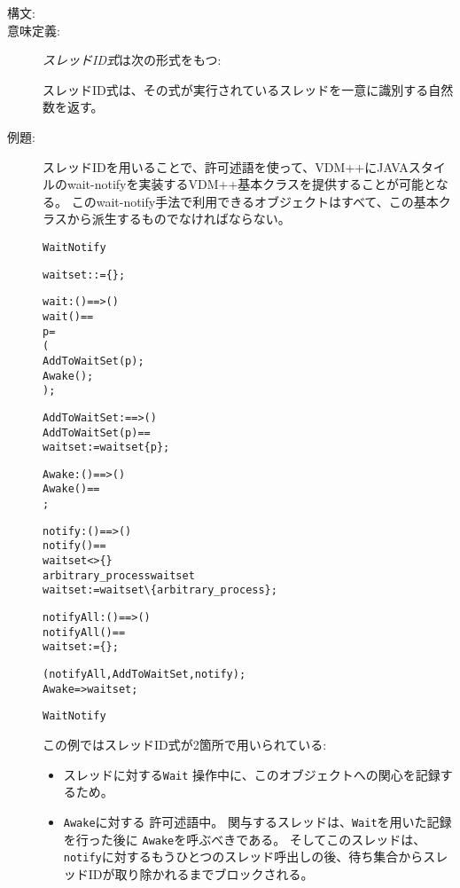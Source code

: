 \documentclass[\pformat,12pt]{jarticle}
\begin{document}
\begin{description}
\item[構文:] 
  
\item[意味定義:] {\it スレッドID式}は次の形式をもつ:

  \begin{alltt}
  \end{alltt}
  スレッドID式は、その式が実行されているスレッドを一意に識別する自然数を返す。

\item[例題:] 
スレッドIDを用いることで、許可述語を使って、VDM++にJAVAスタイルのwait-notifyを実装するVDM++基本クラスを提供することが可能となる。
このwait-notify手法で利用できるオブジェクトはすべて、この基本クラスから派生するものでなければならない。
\begin{alltt}
 WaitNotify

    waitset :  := \{\};

    \PROTECTED wait: () ==> ()
    wait() == 
       p = 
       (
        AddToWaitSet( p );
        Awake();
       );

    AddToWaitSet :  ==> ()
    AddToWaitSet( p ) ==
      waitset := waitset  \{ p \};
      
    Awake: () ==> ()
    Awake() == 
      ;
  
    \PROTECTED notify: () ==> ()
    notify() == 
         waitset <> \{\} 
           arbitrary_process  waitset
            waitset := waitset \verb+\+ \{arbitrary_process\};

    \PROTECTED notifyAll: () ==> ()
    notifyAll() ==
         waitset := \{\};

    (notifyAll, AddToWaitSet, notify);
     Awake =>  waitset;

 WaitNotify
\end{alltt}
この例ではスレッドID式が2箇所で用いられている:
\begin{itemize}
\item スレッドに対する\texttt{Wait} 操作中に、このオブジェクトへの関心を記録するため。
\item  \texttt{Awake}に対する 許可述語中。
関与するスレッドは、\texttt{Wait}を用いた記録を行った後に \texttt{Awake}を呼ぶべきである。
そしてこのスレッドは、\texttt{notify}に対するもうひとつのスレッド呼出しの後、待ち集合からスレッドIDが取り除かれるまでブロックされる。
\end{itemize}


\end{description}
\end{document}

